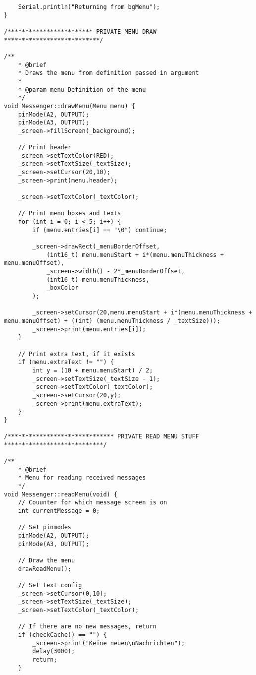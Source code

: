 \documentclass[a4paper, 11pt]{scrartcl}
\begin{document}
\begin{lstlisting}
    Serial.println("Returning from bgMenu");
}

/************************ PRIVATE MENU DRAW ***************************/

/**
    * @brief 
    * Draws the menu from definition passed in argument
    * 
    * @param menu Definition of the menu
    */
void Messenger::drawMenu(Menu menu) {
    pinMode(A2, OUTPUT);
    pinMode(A3, OUTPUT);
    _screen->fillScreen(_background);
    
    // Print header
    _screen->setTextColor(RED);
    _screen->setTextSize(_textSize);
    _screen->setCursor(20,10);
    _screen->print(menu.header);

    _screen->setTextColor(_textColor);
    
    // Print menu boxes and texts
    for (int i = 0; i < 5; i++) {
        if (menu.entries[i] == "\0") continue;

        _screen->drawRect(_menuBorderOffset, 
            (int16_t) menu.menuStart + i*(menu.menuThickness + menu.menuOffset), 
            _screen->width() - 2*_menuBorderOffset, 
            (int16_t) menu.menuThickness, 
            _boxColor
        );

        _screen->setCursor(20,menu.menuStart + i*(menu.menuThickness + menu.menuOffset) + ((int) (menu.menuThickness / _textSize)));
        _screen->print(menu.entries[i]);
    }

    // Print extra text, if it exists
    if (menu.extraText != "") {
        int y = (10 + menu.menuStart) / 2;
        _screen->setTextSize(_textSize - 1);
        _screen->setTextColor(_textColor);
        _screen->setCursor(20,y);
        _screen->print(menu.extraText);
    }
}

/****************************** PRIVATE READ MENU STUFF ****************************/

/**
    * @brief 
    * Menu for reading received messages
    */
void Messenger::readMenu(void) {
    // Couunter for which message screen is on
    int currentMessage = 0;

    // Set pinmodes
    pinMode(A2, OUTPUT);
    pinMode(A3, OUTPUT);
    
    // Draw the menu
    drawReadMenu();

    // Set text config
    _screen->setCursor(0,10);
    _screen->setTextSize(_textSize);
    _screen->setTextColor(_textColor);

    // If there are no new messages, return
    if (checkCache() == "") {
        _screen->print("Keine neuen\nNachrichten");
        delay(3000);
        return;
    }


\end{lstlisting}
\end{document}
